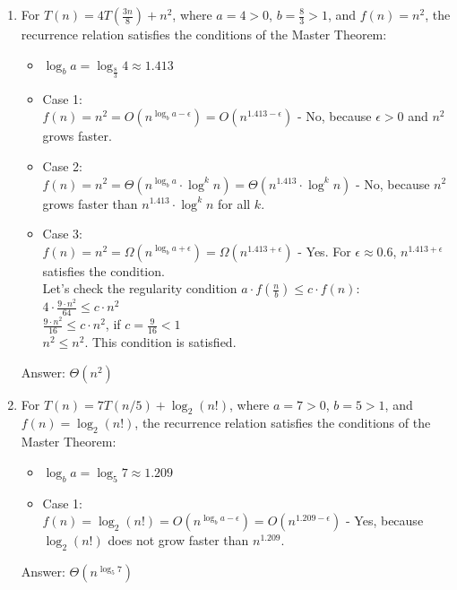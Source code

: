 \documentclass[dvipsnames]{article}
\begin{document}
\begin{enumerate}
\begin{enumerate}
    
\item For $ T(n) = 4 T\left(\frac{3n}{8}\right) + n^2 $, where $ a = 4 > 0 $, $ b = \frac{8}{3} > 1 $, and $ f(n) = n^2 $, the recurrence relation satisfies the conditions of the Master Theorem:
    \begin{itemize}
        \item $ \log_{b} a =\log_{\frac{8}{3}} 4 \approx 1.413 $\\
        \item Case 1: \\
        \hspace{30mm} $ f(n) = n^2 = O(n^{\log_{b} a - \epsilon})= O(n^{1.413 - \epsilon}) $ - No, because $ \epsilon > 0 $ and $ n^2 $ grows faster.
        \item Case 2: \\
        \hspace{30mm} $ f(n) = n^2  = \Theta(n^{\log_{b} a}\cdot \log^k n)= \Theta(n^{1.413} \cdot \log^k n) $ - No, because $ n^2 $ grows faster than $ n^{1.413} \cdot \log^k n $ for all $ k $.
        \item Case 3: \\
        \hspace{30mm} $ f(n) = n^2 = \Omega(n^{\log_{b} a + \epsilon}) = \Omega(n^{1.413 + \epsilon}) $ - Yes. For $ \epsilon \approx 0.6 $, $ n^{1.413 + \epsilon} $ satisfies the condition. \\
        \hspace{30mm} Let's check the regularity condition $ a \cdot f\left(\frac{n}{b}\right) \leq c \cdot f(n) $: \\
        \hspace{35mm} $ 4 \cdot \frac{9 \cdot n^2}{64} \leq c \cdot n^2 $ \\
        \hspace{35mm} $ \frac{9 \cdot n^2}{16} \leq c \cdot n^2 $, if $ c = \frac{9}{16} < 1 $ \\
        \hspace{35mm} $ n^2 \leq n^2 $. This condition is satisfied.
    \end{itemize}
    Answer: $ \Theta(n^2) $

\item For $T(n) = 7 T(n / 5) + \log_2 \left(n!\right)$, where $ a = 7 > 0 $, $ b = 5 > 1 $, and $ f(n) = \log_2 \left(n!\right) $, the recurrence relation satisfies the conditions of the Master Theorem:
    \begin{itemize}
        \item $\log_{b} a = \log_{5} 7 \approx 1.209 $
        \item Case 1: \\
        \hspace{30mm} $ f(n) = \log_2 \left(n!\right) = O(n^{\log_{b} a - \epsilon}) = O(n^{1.209 - \epsilon}) $ - Yes, because $\log_2 \left(n!\right)$ does not grow faster than $n^{1.209}$.
    \end{itemize}
    Answer: $\Theta(n^{\log_{5} 7})$




\end{enumerate}
\end{enumerate}
\end{document}
